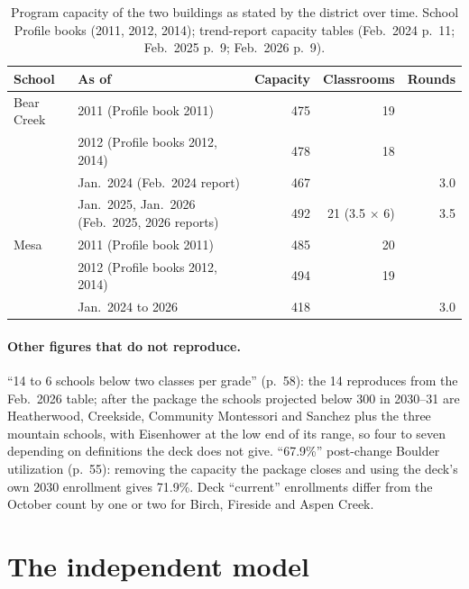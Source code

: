 \documentclass[11pt]{article}
\begin{document}
\begin{table}[htbp]\centering\footnotesize
\caption{Program capacity of the two buildings as stated by the district over time. School Profile books (2011, 2012, 2014); trend-report capacity tables (Feb.\ 2024 p.\ 11; Feb.\ 2025 p.\ 9; Feb.\ 2026 p.\ 9).}\label{tab:capacity}
\begin{tabular}{llrrr}
\toprule
School & As of & Capacity & Classrooms & Rounds \\
\midrule
Bear Creek & 2011 (Profile book 2011) & 475 & 19 & \\
 & 2012 (Profile books 2012, 2014) & 478 & 18 & \\
 & Jan.\ 2024 (Feb.\ 2024 report) & 467 & & 3.0 \\
 & Jan.\ 2025, Jan.\ 2026 (Feb.\ 2025, 2026 reports) & 492 & 21 (3.5 $\times$ 6) & 3.5 \\
Mesa & 2011 (Profile book 2011) & 485 & 20 & \\
 & 2012 (Profile books 2012, 2014) & 494 & 19 & \\
 & Jan.\ 2024 to 2026 & 418 & & 3.0 \\
\bottomrule
\end{tabular}
\end{table}

\paragraph{Other figures that do not reproduce.} ``14 to 6 schools below two classes per grade'' (p.\ 58): the 14 reproduces from the Feb.\ 2026 table; after the package the schools projected below 300 in 2030--31 are Heatherwood, Creekside, Community Montessori and Sanchez plus the three mountain schools, with Eisenhower at the low end of its range, so four to seven depending on definitions the deck does not give. ``67.9\%'' post-change Boulder utilization (p.\ 55): removing the capacity the package closes and using the deck's own 2030 enrollment gives 71.9\%. Deck ``current'' enrollments differ from the October count by one or two for Birch, Fireside and Aspen Creek.

\section{The independent model}\label{app:model}
\end{document}

